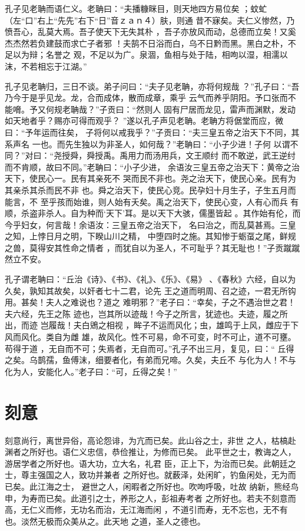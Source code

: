 \documentclass[a4paper,12pt,UTF8,twoside]{ctexbook}
\begin{document}
孔子见老聃而语仁义。老聃曰：“夫播糠眯目，则天地四方易位矣 ；蚊虻（左“口”右上“先先”右下“日”音ｚａｎ４）肤，则通 昔不寐矣。夫仁义惨然，乃愤吾心，乱莫大焉。吾子使天下无失其朴 ，吾子亦放风而动，总德而立矣！又奚杰杰然若负建鼓而求亡子者邪 ！夫鹄不日浴而白，乌不日黔而黑。黑白之朴，不足以为辩；名誉之 观，不足以为广。泉涸，鱼相与处于陆，相呴以湿，相濡以沫，不若相忘于江湖。”

孔子见老聃归，三日不谈。弟子问曰：“夫子见老聃，亦将何规哉 ？”孔子曰：“吾乃今于是乎见龙。龙，合而成体，散而成章，乘乎 云气而养乎阴阳。予口张而不能嗋。予又何规老聃哉？”子贡曰：“然则人 固有尸居而龙见，雷声而渊默，发动如天地者乎？赐亦可得而观乎？ ”遂以孔子声见老聃。老聃方将倨堂而应，微曰：“予年运而往矣， 子将何以戒我乎？”子贡曰：“夫三皇五帝之治天下不同，其系声名 一也。而先生独以为非圣人，如何哉？”老聃曰：“小子少进！子何 以谓不同？”对曰：“尧授舜，舜授禹。禹用力而汤用兵，文王顺纣 而不敢逆，武王逆纣而不肯顺，故曰不同。”老聃曰：“小子少进， 余语汝三皇五帝之治天下：黄帝之治天下，使民心一。民有其亲死不 哭而民不非也。尧之治天下，使民心亲。民有为其亲杀其杀而民不非 也。舜之治天下，使民心竞。民孕妇十月生子，子生五月而能言，不 至乎孩而始谁，则人始有夭矣。禹之治天下，使民心变，人有心而兵 有顺，杀盗非杀人。自为种而‘天下’耳。是以天下大骇，儒墨皆起 。其作始有伦，而今乎妇女，何言哉！余语汝：三皇五帝之治天下， 名曰治之，而乱莫甚焉。三皇之知，上悖日月之明，下睽山川之精， 中堕四时之施。其知惨于蛎虿之尾，鲜规之兽，莫得安其性命之情者 ，而犹自以为圣人，不可耻乎？其无耻也！”子贡蹴蹴然立不安。

孔子谓老聃曰：“丘治《诗》、《书》、《礼》、《乐》、《易》 、《春秋》六经，自以为久矣，孰知其故矣，以奸者七十二君，论先 王之道而明周、召之迹，一君无所钩用。甚矣！夫人之难说也？道之 难明邪？”老子曰：“幸矣，子之不遇治世之君！夫六经，先王之陈 迹也，岂其所以迹哉！今子之所言，犹迹也。夫迹，履之所出，而迹 岂履哉！夫白鶂之相视 ，眸子不运而风化；虫，雄鸣于上风，雌应于下风而风化。类自为雌 雄，故风化。性不可易，命不可变，时不可止，道不可壅。苟得于道 ，无自而不可；失焉者，无自而可。”孔子不出三月，复见，曰：“ 丘得之矣。乌鹊孺，鱼傅沫，细要者化，有弟而兄啼。久矣，夫丘不 与化为人！不与化为人，安能化人。”老子曰：“可，丘得之矣！”

\section{刻意}

刻意尚行，离世异俗，高论怨诽，为亢而已矣。此山谷之士，非世 之人，枯槁赴渊者之所好也。语仁义忠信，恭俭推让，为修而已矣。 此平世之士，教诲之人，游居学者之所好也。语大功，立大名，礼君 臣，正上下，为治而已矣。此朝廷之士，尊主强国之人，致功并兼者 之所好也。就薮泽，处闲旷，钓鱼闲处，无为而已矣。此江海之士， 避世之人，闲暇者之所好也。吹呴呼吸，吐故 纳新，熊经鸟申，为寿而已矣。此道引之士，养形之人，彭祖寿考者 之所好也。若夫不刻意而高，无仁义而修，无功名而治，无江海而闲 ，不道引而寿，无不忘也，无不有也。淡然无极而众美从之。此天地 之道，圣人之德也。
\end{document}
